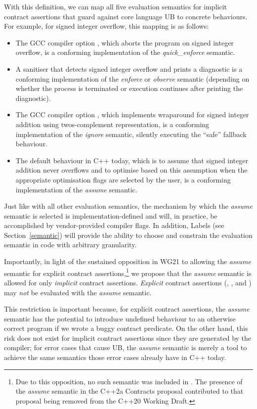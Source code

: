 With this definition, we can map all five evaluation semantics for implicit contract assertions that guard against core language UB to concrete behaviours. For example, for signed integer overflow, this mapping is as follows:
\begin{itemize}
\item The GCC compiler option , which aborts the program on signed integer overflow, is a conforming implementation of the \emph{quick_enforce} semantic.
\item A sanitiser that detects signed integer overflow and prints a diagnostic is a conforming
implementation of the \emph{enforce} or \emph{observe} semantic (depending on whether the
process is terminated or execution continues after printing the diagnostic).
\item The GCC compiler option , which implements wraparound for signed integer addition using twos-complement representation, is a conforming implementation of the \emph{ignore} semantic,  silently executing the ``safe'' fallback behaviour.
\item The default behaviour in C++ today, which is to assume that signed integer addition never overflows and to optimise based on this assumption when the appropriate optimisation flags are selected by the user, is a conforming implementation of the \emph{assume} semantic.
\end{itemize}
Just like with all other evaluation semantics, the mechanism by which the \emph{assume} semantic is selected is implementation-defined and will, in practice, be accomplished by vendor-provided compiler flags. In addition, Labels (see Section~\ref{semantic}) will provide the ability to choose and constrain the evaluation semantic in code with arbitrary granularity.

Importantly, in light of the sustained opposition in WG21 to allowing the \emph{assume} semantic for explicit contract assertions,\footnote{Due to this opposition, no such semantic was included in \cite{P2900R14}. The presence of the \emph{assume} semantic in the C++2a Contracts proposal \cite{P0542R5} contributed to that proposal being removed from the C++20 Working Draft.} we propose that the \emph{assume} semantic is allowed for only \emph{implicit} contract assertions. \emph{Explicit} contract assertions (, , and ) may \emph{not} be evaluated with the \emph{assume} semantic.

This restriction is important because, for explicit contract assertions, the \emph{assume} semantic  has the potential to introduce undefined behaviour to an otherwise correct program if we wrote a buggy contract predicate. On the other hand, this risk does not exist for implicit contract assertions since they are generated by the compiler; for error cases that cause UB, the \emph{assume} semantic is merely a tool to achieve the same semantics those error cases already have in C++ today.

